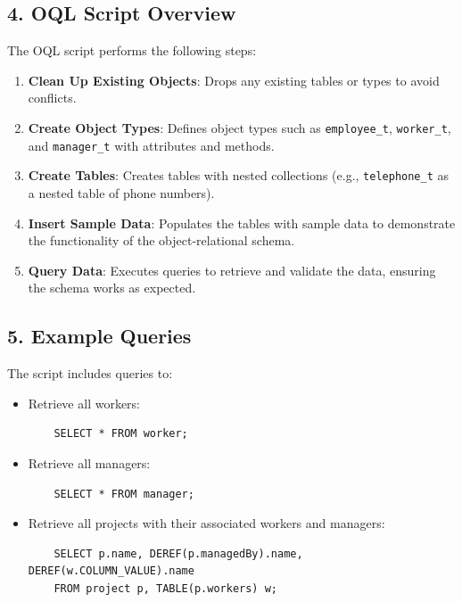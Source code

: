 \documentclass{article}
\begin{document}
\subsection*{4. OQL Script Overview}
The OQL script performs the following steps:
\begin{enumerate}
    \item \textbf{Clean Up Existing Objects}: Drops any existing tables or types to avoid conflicts.
    \item \textbf{Create Object Types}: Defines object types such as \texttt{employee\_t}, \texttt{worker\_t}, and \texttt{manager\_t} with attributes and methods.
    \item \textbf{Create Tables}: Creates tables with nested collections (e.g., \texttt{telephone\_t} as a nested table of phone numbers).
    \item \textbf{Insert Sample Data}: Populates the tables with sample data to demonstrate the functionality of the object-relational schema.
    \item \textbf{Query Data}: Executes queries to retrieve and validate the data, ensuring the schema works as expected.
\end{enumerate}

\subsection*{5. Example Queries}
The script includes queries to:
\begin{itemize}
    \item Retrieve all workers:
    \begin{verbatim}
    SELECT * FROM worker;
    \end{verbatim}
    \item Retrieve all managers:
    \begin{verbatim}
    SELECT * FROM manager;
    \end{verbatim}
    \item Retrieve all projects with their associated workers and managers:
    \begin{verbatim}
    SELECT p.name, DEREF(p.managedBy).name, DEREF(w.COLUMN_VALUE).name
    FROM project p, TABLE(p.workers) w;
    \end{verbatim}
\end{itemize}
\end{document}
